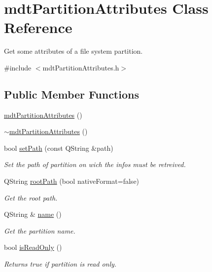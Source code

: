 \hypertarget{classmdt_partition_attributes}{\section{mdt\-Partition\-Attributes Class Reference}
\label{classmdt_partition_attributes}
}


Get some attributes of a file system partition.  




{\ttfamily \#include $<$mdt\-Partition\-Attributes.\-h$>$}

\subsection*{Public Member Functions}
\begin{DoxyCompactItemize}
\item 
\hyperlink{classmdt_partition_attributes_a8b7db89db2f1bc56de220175c41d61e0}{mdt\-Partition\-Attributes} ()
\item 
\hyperlink{classmdt_partition_attributes_a3cab0ca191b19e7b21485691f4ca4a2e}{$\sim$mdt\-Partition\-Attributes} ()
\item 
bool \hyperlink{classmdt_partition_attributes_a2d8e383af725587f0144f573da0f2bd3}{set\-Path} (const Q\-String \&path)
\begin{DoxyCompactList}\small\item\em Set the path of partition on wich the infos must be retreived. \end{DoxyCompactList}\item 
Q\-String \hyperlink{classmdt_partition_attributes_ad9b5b813fc9c8ae00f602864903af9fb}{root\-Path} (bool native\-Format=false)
\begin{DoxyCompactList}\small\item\em Get the root path. \end{DoxyCompactList}\item 
Q\-String \& \hyperlink{classmdt_partition_attributes_a365cb772d258e6752728fb66d089b31f}{name} ()
\begin{DoxyCompactList}\small\item\em Get the partition name. \end{DoxyCompactList}\item 
bool \hyperlink{classmdt_partition_attributes_ae719e29cf5e5b136ca282aab5acec36e}{is\-Read\-Only} ()
\begin{DoxyCompactList}\small\item\em Returns true if partition is read only. \end{DoxyCompactList}\item 

\end{DoxyCompactItemize}
